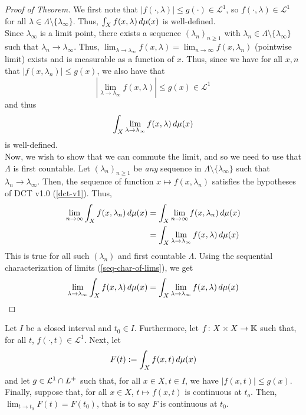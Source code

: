 \documentclass[11pt,leqno,oneside]{amsbook}
\numberwithin{thm}{section}
\newcommand{\cL}{\mathcal{L}}
\newcommand{\K}{\mathbb{K}} %
\begin{document}
\begin{proof}[Proof of Theorem]
  We first note that \(|f(\cdot,\lambda)| \leq g(\cdot) \in \cL^1\),
  so \(f(\cdot, \lambda) \in \cL^1\) for all \(\lambda \in \Lambda
  \setminus \{\lambda_\infty\}\). Thus, \(\int_X f(x,\lambda) \, d
  \mu(x)\) is well-defined. \\

  Since \(\lambda_\infty\) is a limit point, there exists a sequence
  \((\lambda_n)_{n \geq 1}\) with \(\lambda_n \in \Lambda \setminus
  \{\lambda_\infty\}\) such that \(\lambda_n \to
  \lambda_\infty\). Thus, \(\lim_{\lambda \to \lambda_\infty}
  f(x,\lambda) = \lim_{n \to \infty} f(x,\lambda_n)\) (pointwise
  limit) exists and is measurable as a function of \(x\). Thus, since
  we have for all \(x,n\) that \(|f(x,\lambda_n)| \leq g(x)\), we also
  have that \[
   \left|  \lim_{\lambda \to \lambda_\infty} f(x,\lambda) \right| \leq
   g(x) \in \cL^1
  \]
  and thus\[
    \int_X \lim_{\lambda \to \lambda_\infty} f(x,\lambda) \, d \mu(x)
  \]
  is well-defined. \\

  Now, we wish to show that we can commute the limit, and so we need
  to use that \(\Lambda\) is first countable. Let \((\lambda_n)_{n
    \geq 1}\) be \emph{any} sequence in \(\Lambda \setminus
  \{\lambda_\infty\}\) such that \(\lambda_n \to
  \lambda_\infty\). Then, the sequence of function \(x \mapsto
  f(x,\lambda_n)\) satisfies the hypotheses of DCT v1.0
  (\ref{dct-v1}). Thus,
  \begin{align*}
    \lim_{n \to \infty} \int_X f(x,\lambda_n) \, d \mu(x)
    & = \int_X \lim_{n \to \infty} f(x,\lambda_n) \, d \mu(x) \\
    & = \int_X \lim_{\lambda \to \lambda_\infty} f(x,\lambda) \, d \mu(x)
  \end{align*}
  This is true for all such \((\lambda_n)\) and first countable
  \(\Lambda\). Using the sequential characterization of limits
  (\ref{seq-char-of-lims}), we get \[
    \lim_{\lambda \to \lambda_\infty} \int_X f(x,\lambda) \, d \mu(x) =
    \int_X \lim_{\lambda \to \lambda_\infty} f(x,\lambda) \, d \mu(x)
  \]
\end{proof}
\begin{cor}
  Let \(I\) be a closed interval and \(t_0 \in I\). Furthermore, let
  \(f \from X \times X \to \K\) such that, for all \(t\), \(f(\cdot,t)
  \in \cL^1\). Next, let \[
    F(t) := \int_X f(x,t) \, d\mu(x)
  \]
  and let \(g \in \cL^1 \intersect L^+\) such that, for all \(x \in X,
  t \in I\), we have \(|f(x,t)| \leq g(x)\). Finally, suppose that,
  for all \(x \in X\), \(t \mapsto f(x,t)\) is continuous at
  \(t_o\). Then, \(\lim_{t \to t_0} F(t) = F(t_0)\), that is to say
  \(F\) is continuous at \(t_0\).
\end{cor}
\end{document}
